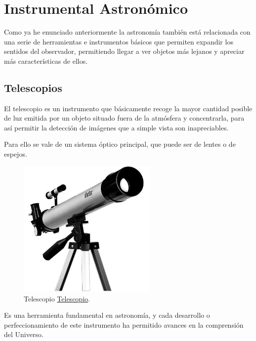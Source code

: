 \newpage

\newpage
\section{Instrumental Astronómico}

Como ya he enunciado anteriormente la astronomía también está relacionada  con una serie de herramientas e instrumentos básicos que permiten expandir los sentidos del observador, permitiendo llegar a ver objetos más lejanos y apreciar más características de ellos.  

\subsection{Telescopios}

El telescopio es un instrumento que básicamente recoge la mayor cantidad posible de luz emitida por un objeto situado fuera de la atmósfera y concentrarla, para así permitir la detección de imágenes que a simple vista son inapreciables\cite{Telescopio}.

\bigskip
Para ello se vale de un sistema óptico principal, que puede ser de lentes o de espejos.

\begin{figure}[!ht]
	\begin{center}
		\includegraphics[width=0.6\textwidth]{../images/telescopio2.jpg}
			\caption[Telescopio]{Telescopio \href{http://cienciaaaoa.blogspot.com.es/2014/11/instrumentos-cientificos_20.html}{Telescopio}.}
		\label{fig:telescop}
	\end{center}
\end{figure}

\bigskip
 Es una herramienta fundamental en astronomía, y cada desarrollo o perfeccionamiento de este instrumento ha permitido avances en la comprensión del Universo.

